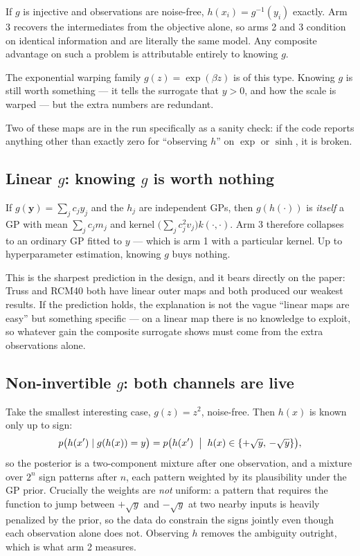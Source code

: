 \documentclass[11pt]{article}
\begin{document}
If $g$ is injective and observations are noise-free, $h(x_i)=g^{-1}(y_i)$
exactly. Arm 3 recovers the intermediates from the objective alone, so arms 2
and 3 condition on identical information and are literally the same model. Any
composite advantage on such a problem is attributable entirely to knowing $g$.

The exponential warping family $g(z)=\exp(\beta z)$ is of this type. Knowing $g$
is still worth something --- it tells the surrogate that $y>0$, and how the scale
is warped --- but the extra numbers are redundant.

Two of these maps are in the run specifically as a sanity check: if the code
reports anything other than exactly zero for ``observing $h$'' on $\exp$ or
$\sinh$, it is broken.

\subsection{Linear $g$: knowing $g$ is worth nothing}

If $g(\mathbf{y})=\sum_j c_jy_j$ and the $h_j$ are independent GPs, then
$g(h(\cdot))$ is \emph{itself} a GP with mean $\sum_jc_jm_j$ and kernel
$\bigl(\sum_jc_j^2v_j\bigr)k(\cdot,\cdot)$. Arm 3 therefore collapses to an
ordinary GP fitted to $y$ --- which is arm 1 with a particular kernel. Up to
hyperparameter estimation, knowing $g$ buys nothing.

This is the sharpest prediction in the design, and it bears directly on the
paper: Truss and RCM40 both have linear outer maps and both produced our weakest
results. If the prediction holds, the explanation is not the vague ``linear maps
are easy'' but something specific --- on a linear map there is no knowledge to
exploit, so whatever gain the composite surrogate shows must come from the extra
observations alone.

\subsection{Non-invertible $g$: both channels are live}

Take the smallest interesting case, $g(z)=z^2$, noise-free. Then $h(x)$ is known
only up to sign:
\begin{equation}
p\bigl(h(x')\mid g(h(x))=y\bigr)
=p\bigl(h(x')\;\bigm|\;h(x)\in\{+\sqrt{y},\,-\sqrt{y}\}\bigr),
\label{eq:square}
\end{equation}
so the posterior is a two-component mixture after one observation, and a mixture
over $2^n$ sign patterns after $n$, each pattern weighted by its plausibility
under the GP prior. Crucially the weights are \emph{not} uniform: a pattern that
requires the function to jump between $+\sqrt{y}$ and $-\sqrt{y}$ at two nearby
inputs is heavily penalized by the prior, so the data do constrain the signs
jointly even though each observation alone does not. Observing $h$ removes the
ambiguity outright, which is what arm 2 measures.
\end{document}
